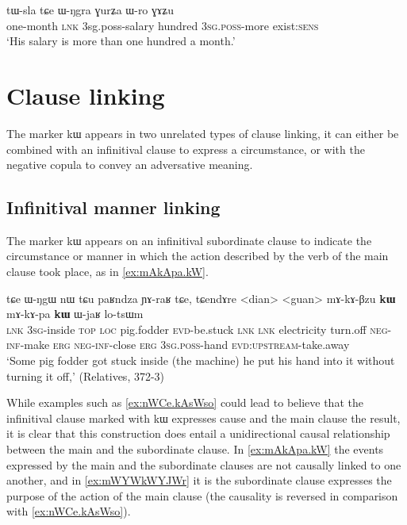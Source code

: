 \documentclass[oldfontcommands,oneside,a4paper,11pt]{article}
\newcommand{\ipa}[1]{{\phon #1}} %
\begin{document}
 \begin{exe} 
\ex \label{ex:tWsla.tCe}
\gll  
  \ipa{tɯ-sla} \ipa{tɕe} \ipa{ɯ-ŋgra} \ipa{ɣurʑa} \ipa{ɯ-ro} \ipa{ɣɤʑu} \\
  one-month \textsc{lnk} 3sg.poss-salary hundred \textsc{3sg.poss}-more exist:\textsc{sens} \\
  \glt `His salary is more than one hundred a month.'
  \end{exe}  
 \section{Clause linking} \label{sec:linking}
 The marker \ipa{kɯ} appears in two unrelated types of clause linking, it can either be combined with an infinitival clause to express a circumstance, or with the negative copula to convey an adversative meaning.
 
 \subsection{Infinitival manner linking} \label{sec:manner}
The marker \ipa{kɯ}  appears on an infinitival subordinate clause  to indicate the circumstance or manner in which the action described by the verb of the main clause took place, as in \ref{ex:mAkApa.kW}. 

\begin{exe}
\ex \label{ex:mAkApa.kW}
\gll
\ipa{tɕe}   	\ipa{ɯ-ŋgɯ}   	\ipa{nɯ} \ipa{tɕu}   	\ipa{paʁndza}   	\ipa{ɲɤ-raʁ}   	\ipa{tɕe,}   	\ipa{tɕendɤre}   	<dian>   	<guan>   	\ipa{mɤ-kɤ-βzu} 	\ipa{\textbf{kɯ}}   	\ipa{mɤ-kɤ-pa}   	\ipa{\textbf{kɯ}}   	\ipa{ɯ-jaʁ}   	\ipa{lo-tsɯm}   \\
\textsc{lnk} \textsc{3sg}-inside \textsc{top} \textsc{loc} pig.fodder \textsc{evd}-be.stuck \textsc{lnk}
\textsc{lnk} electricity turn.off \textsc{neg-inf}-make \textsc{erg}  \textsc{neg-inf}-close \textsc{erg}  \textsc{3sg.poss}-hand \textsc{evd:upstream}-take.away \\
\glt `Some pig fodder got stuck inside (the machine) he put his hand into it without turning it off,' (Relatives, 372-3)
\end{exe} 

 While  examples such as \ref{ex:nWCe.kAsWso} could lead to believe that the infinitival clause marked with \ipa{kɯ}  expresses  cause and the main clause the result, it is clear that this construction does entail a unidirectional causal relationship between the main and the subordinate clause. In \ref{ex:mAkApa.kW} the events expressed by the main and the subordinate clauses are not causally linked to one another, and in  \ref{ex:mWYWkWYJWr} it is the subordinate clause expresses the purpose of the action of the main clause (the causality is reversed in comparison with \ref{ex:nWCe.kAsWso}).
\end{document}
